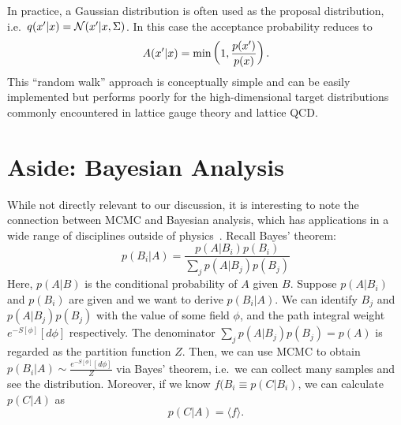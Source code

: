 \documentclass[../main.tex]{subfiles}
\begin{document}
%
In practice, a Gaussian distribution is often used as the proposal distribution, i.e.\ $q({x^{\prime}} | x) = \mathcal{N}({x^{\prime}} |
x, \Sigma)$. In this case the acceptance probability reduces to
%
\begin{equation}
  A({x^{\prime}} | x) = \min\left(1, \frac{p({x^{\prime}})}{p(x)}\right).
\end{equation}
%
This ``random walk'' approach is conceptually simple and can be easily implemented but performs poorly for
the high-dimensional target distributions commonly encountered in lattice gauge theory and lattice QCD.
%
%
%
%
\section{Aside: Bayesian Analysis}
%
While not directly relevant to our discussion, it is interesting to note the connection between MCMC and Bayesian
analysis, which has applications in a wide range of disciplines outside of physics~\cite{mcmc_for_dummies}.
%
Recall Bayes' theorem:
%
\begin{equation}
  p(B_{i}|A) = \frac{p(A|B_{i}) p(B_{i})}{\sum_{j} p(A|B_{j}) p(B_{j})}
  \label{eq:bayes_theorem}
\end{equation}
%
Here, $p(A|B)$ is the conditional probability of $A$ given $B$.
%
Suppose $p(A|B_{i})$ and $p(B_{i})$ are given and we want to derive $p(B_{i}|A)$.
%
We can identify $B_{j}$ and $p(A|B_{j}) p(B_{j})$ with the value of some field $\phi$, and the path integral weight
$e^{-S[\phi]}[d\phi]$ respectively.
%
The denominator $\sum_{j} p(A|B_{j}) p(B_{j}) = p(A)$ is regarded as the partition function $Z$.
%
Then, we can use MCMC to obtain $p(B_{i}|A) \sim \frac{e^{-S[\phi]}[d\phi]}{Z}$ via Bayes' theorem, i.e.\ we can
collect many samples and see the distribution.
%
Moreover, if we know $f(B_{i} \equiv p(C|B_{i})$, we can calculate $p(C|A)$ as
%
\begin{equation}
  p(C|A) = \langle f \rangle.
\end{equation}
%
%
\end{document}
